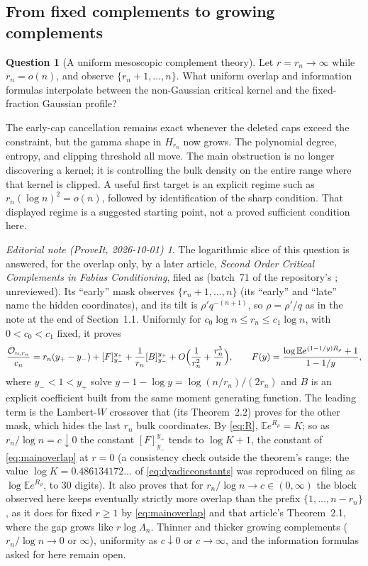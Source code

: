 \documentclass[11pt,oneside]{article}
\numberwithin{equation}{section}
\theoremstyle{plain}
\theoremstyle{definition}
\newtheorem{question}{Question}
\theoremstyle{remark}
\newtheorem*{ednotelater}{Editorial note (ProveIt, 2026-10-01)}
\newcommand{\E}{\mathbb E}
\newcommand{\OO}{\mathcal O}
\begin{document}
\subsection{From fixed complements to growing complements}
\begin{question}[A uniform mesoscopic complement theory]
Let $r=r_n\to\infty$ while $r_n=o(n)$, and observe
$\{r_n+1,\ldots,n\}$. What uniform overlap and information formulas
interpolate between the non-Gaussian critical kernel and the
fixed-fraction Gaussian profile?
\end{question}
The early-cap cancellation remains exact whenever the deleted caps
exceed the constraint, but the gamma shape in $H_{r_n}$ now grows.
The polynomial degree, entropy, and clipping threshold all move.
The main obstruction is no longer discovering a kernel; it is
controlling the bulk density on the entire range where that kernel
is clipped. A useful first target is an explicit regime such as
$r_n(\log n)^2=o(n)$, followed by identification of the sharp
condition. That displayed regime is a suggested starting point,
not a proved sufficient condition here.
\begin{ednotelater}
The logarithmic slice of this question is answered, for the overlap
only, by a later article, \emph{Second Order Critical Complements in
Fabius Conditioning}, filed as
(batch~71 of the repository's ; unreviewed). Its
``early'' mask observes $\{r_n+1,\ldots,n\}$ (its ``early'' and ``late''
name the hidden coordinates), and its tilt is $\rho'q^{-(n+1)}$, so
$\rho=\rho'/q$ as in the note at the end of Section~1.1. Uniformly for
$c_0\log n\le r_n\le c_1\log n$, with $0<c_0<c_1$ fixed, it proves
\[
\frac{\OO_{n,r_n}}{c_n}=r_n(y_+-y_-)+[F]_{y_-}^{y_+}
 +\frac1{r_n}[B]_{y_-}^{y_+}
 +O\Bigl(\frac1{r_n^2}+\frac{r_n^3}{n}\Bigr),\qquad
F(y)=\frac{\log\E e^{(1-1/y)R_\rho}+1}{1-1/y},
\]
where $y_-<1<y_+$ solve $y-1-\log y=\log(n/r_n)/(2r_n)$ and $B$ is an
explicit coefficient built from the same moment generating function. The
leading term is the Lambert-$W$ crossover that
 (its Theorem~2.2)
proves for the other mask, which hides the last $r_n$ bulk coordinates.
By \eqref{eq:R}, $\E e^{R_\rho}=K$; so as $r_n/\log n=c\downarrow0$ the
constant $[F]_{y_-}^{y_+}$ tends to $\log K+1$, the constant of
\eqref{eq:mainoverlap} at $r=0$ (a consistency check outside the
theorem's range; the value $\log K=0.486134172\ldots$ of
\eqref{eq:dyadicconstants} was reproduced on filing as
$\log\E e^{R_\rho}$, to 30 digits). It also proves that for
$r_n/\log n\to c\in(0,\infty)$ the block observed here keeps eventually
strictly more overlap than the prefix $\{1,\ldots,n-r_n\}$, as it does
for fixed $r\ge1$ by \eqref{eq:mainoverlap} and that article's
Theorem~2.1, where the gap grows like $r\log\Lambda_n$. Thinner and
thicker growing complements ($r_n/\log n\to0$ or $\infty$), uniformity
as $c\downarrow0$ or $c\to\infty$, and the information formulas asked
for here remain open.
\end{ednotelater}
\end{document}
